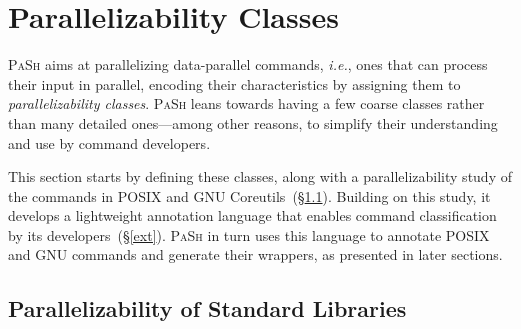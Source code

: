 \documentclass[sigplan, review, screen, anonymous]{acmart}
\newcommand{\ie}{{\em i.e.}, }
\newcommand{\kk}[1]{[{\color{magenta}kk: #1}]}
\newcommand{\sx}[1]{(\S\ref{#1})}
\newcommand{\sys}{{\scshape PaSh}\xspace}
\begin{document}


\section{Parallelizability Classes}
\label{parallelizability}

\sys aims at parallelizing data-parallel commands, \ie ones that can process their input in parallel, encoding their characteristics by assigning them to
\emph{parallelizability classes}.
\sys leans towards having a few coarse classes rather than many detailed ones---among other reasons, to simplify their understanding and use by command developers.

This section starts by defining these classes, along with a parallelizability study of the commands in {\sc POSIX} and GNU Coreutils~\sx{cmd}.
Building on this study, it develops a lightweight annotation language that enables command classification by its developers~\sx{ext}.
\sys in turn uses this language to annotate POSIX and GNU commands and generate their wrappers, as presented in later sections.

\subsection{Parallelizability of Standard Libraries}
\label{cmd}
\end{document}
